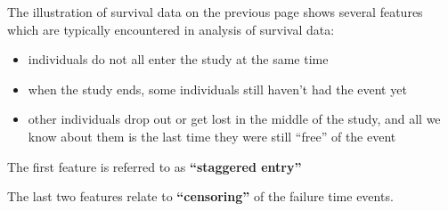 \documentclass[envcountsect, 10pt, portrait, palatino]{beamer}
\begin{document}
\begin{frame}{}
The illustration of survival data on the previous page shows
several features which are typically encountered in analysis
of survival data:

\begin{itemize}
\item individuals do not all enter the study at the same time
\item when the study ends, some individuals still haven't had
the event yet
\item other individuals drop out or get lost in the middle of
the study, and all we know about them is the last time they
were still ``free'' of the event
\end{itemize}

The first feature is referred to as {\bf ``staggered entry''}

The last two features relate to {\bf ``censoring''} of the
failure time events.
\end{frame}
\end{document}
